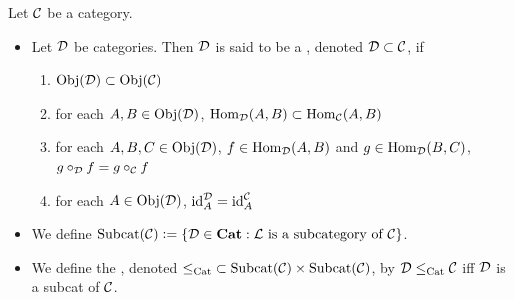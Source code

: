 \documentclass{book}
\begin{document}
	
	
	
	
	
	\begin{defn} 
		Let $\MC$ be a category. 
		\begin{itemize}
			\item Let $\MD$ be categories. Then $\MD$ is said to be a , denoted $\MD \subset \MC$, if 
			\begin{enumerate}
				\item $\Obj(\MD) \subset \Obj(\MC)$
				\item for each $A, B \in \Obj(\MD)$, $\Hom_{\MD}(A,B) \subset \Hom_{\MC}(A, B)$
				\item for each $A,B,C \in \Obj(\MD)$, $f \in \Hom_{\MD}(A, B)$ and $g \in \Hom_{\MD}(B, C)$, $g \circ_{\MD} f = g \circ_{\MC} f$
				\item for each $A \in \Obj(\MD)$, $\id_A^{\MD} = \id_A^{\MC}$
			\end{enumerate}
			\item We define $\Subcat(\MC) \defeq \{\MD \in \bCat: \text{$\ML$ is a subcategory of $\MC$}\}$. 
			\item We define the , denoted ${\leqcat} \subset \Subcat(\MC) \times \Subcat(\MC)$, by $\MD \leqcat \MC$ iff $\MD$ is a subcat of $\MC$.  
		\end{itemize}
	\end{defn}
	
\end{document}
